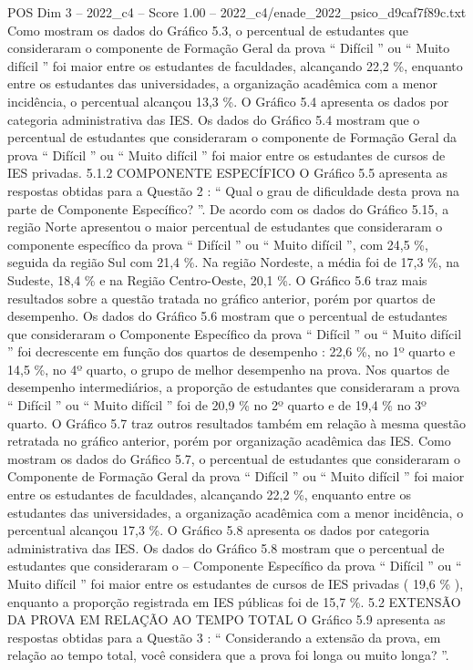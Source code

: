 \begin{textsample}{POS Dim 3 – 2022\_c4 – Score 1.00 – 2022\_c4/enade\_2022\_psico\_d9caf7f89c.txt}
Como mostram os dados do Gráfico 5.3, o percentual de estudantes que consideraram o componente de Formação Geral da prova “ Difícil ” ou “ Muito difícil ” foi maior entre os estudantes de faculdades, alcançando 22,2 \%, enquanto entre os estudantes das universidades, a organização acadêmica com a menor incidência, o percentual alcançou 13,3 \%.
O Gráfico 5.4 apresenta os dados por categoria administrativa das IES.
Os dados do Gráfico 5.4 mostram que o percentual de estudantes que consideraram o componente de Formação Geral da prova “ Difícil ” ou “ Muito difícil ” foi maior entre os estudantes de cursos de IES privadas. 5.1.2 COMPONENTE ESPECÍFICO O Gráfico 5.5 apresenta as respostas obtidas para a Questão 2 : “ Qual o grau de dificuldade desta prova na parte de Componente Específico? ”.
De acordo com os dados do Gráfico 5.15, a região Norte apresentou o maior percentual de estudantes que consideraram o componente específico da prova “ Difícil ” ou “ Muito difícil ”, com 24,5 \%, seguida da região Sul com 21,4 \%.
Na região Nordeste, a média foi de 17,3 \%, na Sudeste, 18,4 \% e na Região Centro-Oeste, 20,1 \%.
O Gráfico 5.6 traz mais resultados sobre a questão tratada no gráfico anterior, porém por quartos de desempenho.
Os dados do Gráfico 5.6 mostram que o percentual de estudantes que consideraram o Componente Específico da prova “ Difícil ” ou “ Muito difícil ” foi decrescente em função dos quartos de desempenho : 22,6 \%, no 1º quarto e 14,5 \%, no 4º quarto, o grupo de melhor desempenho na prova.
Nos quartos de desempenho intermediários, a proporção de estudantes que consideraram a prova “ Difícil ” ou “ Muito difícil ” foi de 20,9 \% no 2º quarto e de 19,4 \% no 3º quarto.
O Gráfico 5.7 traz outros resultados também em relação à mesma questão retratada no gráfico anterior, porém por organização acadêmica das IES.
Como mostram os dados do Gráfico 5.7, o percentual de estudantes que consideraram o Componente de Formação Geral da prova “ Difícil ” ou “ Muito difícil ” foi maior entre os estudantes de faculdades, alcançando 22,2 \%, enquanto entre os estudantes das universidades, a organização acadêmica com a menor incidência, o percentual alcançou 17,3 \%.
O Gráfico 5.8 apresenta os dados por categoria administrativa das IES.
Os dados do Gráfico 5.8 mostram que o percentual de estudantes que consideraram o – Componente Específico da prova “ Difícil ” ou “ Muito difícil ” foi maior entre os estudantes de cursos de IES privadas ( 19,6 \% ), enquanto a proporção registrada em IES públicas foi de 15,7 \%. 5.2 EXTENSÃO DA PROVA EM RELAÇÃO AO TEMPO TOTAL O Gráfico 5.9 apresenta as respostas obtidas para a Questão 3 : “ Considerando a extensão da prova, em relação ao tempo total, você considera que a prova foi longa ou muito longa? ”.

\end{textsample}
